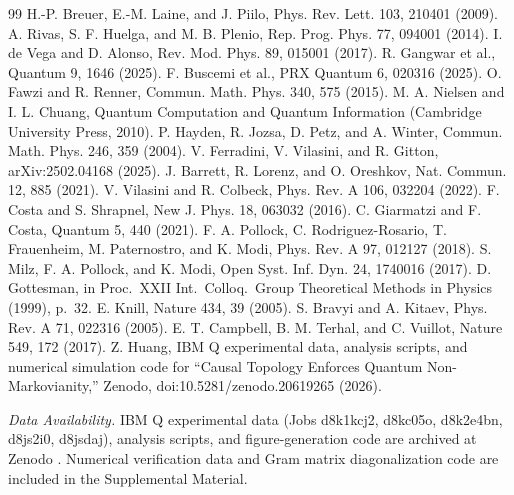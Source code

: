 \documentclass[twocolumn,aps,prl,floatfix]{revtex4-2}
\begin{document}
\begin{thebibliography}{99}
 H.-P. Breuer, E.-M. Laine, and J. Piilo, Phys. Rev. Lett. 103, 210401 (2009).
 A. Rivas, S. F. Huelga, and M. B. Plenio, Rep. Prog. Phys. 77, 094001 (2014).
 I. de Vega and D. Alonso, Rev. Mod. Phys. 89, 015001 (2017).
 R. Gangwar et al., Quantum 9, 1646 (2025).
 F. Buscemi et al., PRX Quantum 6, 020316 (2025).
 O. Fawzi and R. Renner, Commun. Math. Phys. 340, 575 (2015).
 M. A. Nielsen and I. L. Chuang, Quantum Computation and Quantum Information (Cambridge University Press, 2010).
 P. Hayden, R. Jozsa, D. Petz, and A. Winter, Commun. Math. Phys. 246, 359 (2004).
 V. Ferradini, V. Vilasini, and R. Gitton, arXiv:2502.04168 (2025).
 J. Barrett, R. Lorenz, and O. Oreshkov, Nat. Commun. 12, 885 (2021).
 V. Vilasini and R. Colbeck, Phys. Rev. A 106, 032204 (2022).
 F. Costa and S. Shrapnel, New J. Phys. 18, 063032 (2016).
 C. Giarmatzi and F. Costa, Quantum 5, 440 (2021).
 F. A. Pollock, C. Rodriguez-Rosario, T. Frauenheim, M. Paternostro, and K. Modi, Phys. Rev. A 97, 012127 (2018).
 S. Milz, F. A. Pollock, and K. Modi, Open Syst. Inf. Dyn. 24, 1740016 (2017).
 D. Gottesman, in Proc.\ XXII Int.\ Colloq.\ Group Theoretical Methods in Physics (1999), p.\ 32.
 E. Knill, Nature 434, 39 (2005).
 S. Bravyi and A. Kitaev, Phys. Rev. A 71, 022316 (2005).
 E. T. Campbell, B. M. Terhal, and C. Vuillot, Nature 549, 172 (2017).
 Z. Huang, IBM Q experimental data, analysis scripts, and numerical simulation code for ``Causal Topology Enforces Quantum Non-Markovianity,'' Zenodo, doi:10.5281/zenodo.20619265 (2026).
\end{thebibliography}

\vspace{6pt}
\noindent\textit{Data Availability.} IBM Q experimental data (Jobs d8k1kcj2, d8kc05o, d8k2e4bn, d8js2i0, d8jsdaj), analysis scripts, and figure-generation code are archived at Zenodo \cite{zenodo20619265}. Numerical verification data and Gram matrix diagonalization code are included in the Supplemental Material.
\end{document}
